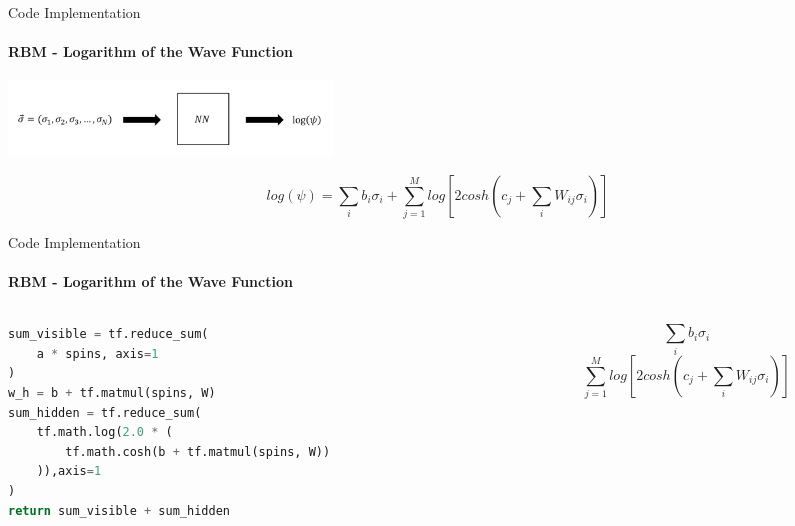 \documentclass{beamer}
\begin{document}
\begin{frame}[fragile]{Code Implementation}
\framesubtitle{RBM - Logarithm of the Wave Function}

\begin{center}
    \includegraphics[height=2cm]{images/rbm_usage.png}
\end{center}

$$log\left(\psi\right) = \sum_{i} b_i \sigma_i + \sum_{j=1}^{M} log\left[{2 cosh\left(c_j + \sum_{i} W_{ij} \sigma_i\right)} \right]$$

\end{frame}

\begin{frame}[fragile]{Code Implementation}
\framesubtitle{RBM - Logarithm of the Wave Function}
\begin{columns}
\begin{column}{0.6\textwidth}
\begin{lstlisting}[language=Python, style=kaolstplain]
sum_visible = tf.reduce_sum(
	a * spins, axis=1
)
w_h = b + tf.matmul(spins, W)
sum_hidden = tf.reduce_sum(
	tf.math.log(2.0 * (
		tf.math.cosh(b + tf.matmul(spins, W))
	)),axis=1
)
return sum_visible + sum_hidden
\end{lstlisting}
\end{column}
\begin{column}{0.38\textwidth}
$$\sum_{i} b_i \sigma_i$$
$$\sum_{j=1}^{M} log\left[{2 cosh\left(c_j + \sum_{i} W_{ij} \sigma_i\right)} \right]$$
\end{column}
\end{columns}

\end{frame}
\end{document}
